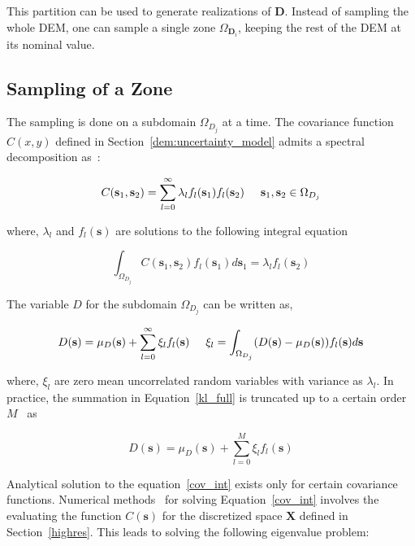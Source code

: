 This partition can be used to generate realizations of $\textbf{D}$. Instead of sampling the whole DEM, one can sample a single zone $\Omega_{\textbf{D}_i}$, keeping the rest of the DEM at its nominal value. 


\subsection{Sampling of a Zone}

The sampling is done on a subdomain $\Omega_{D_j}$ at a time. The covariance function $C(x,y)$ defined in Section~\ref{dem:uncertainty_model} admits a spectral decomposition as~\cite{ghanem2003stochastic}:

\begin{equation}
\label{cov_int}
C(\textbf{s}_1,\textbf{s}_2) = \sum_{l=0}^\infty \lambda_l f_l(\textbf{s}_1) f_l(\textbf{s}_2) \hspace{5mm} \textbf{s}_1,\textbf{s}_2 \in \Omega_{D_j}
\end{equation}

\noindent where, $\lambda_l$ and $f_l(\textbf{s})$ are solutions to the following integral equation

\begin{equation}
\int_{\Omega_{D_j}} C(\textbf{s}_1,\textbf{s}_2) f_l(\textbf{s}_1)d\textbf{s}_1 = \lambda_l f_l(\textbf{s}_2)
\end{equation}

The variable $D$ for the subdomain $\Omega_{D_j}$ can be written as,

\begin{equation}
\label{kl_full}
D(\textbf{s}) = \mu_D(\textbf{s}) + \sum_{l=0}^\infty \xi_l f_l(\textbf{s}) \hspace{5mm} \xi_l = \int_{\Omega_{D_j}} (D(\textbf{s}) - \mu_D(\textbf{s}) )f_l(\textbf{s})d\textbf{s}
\end{equation}

\noindent where, $\xi_l$ are zero mean uncorrelated random variables with variance as $\lambda_l$. In practice, the summation in Equation~\ref{kl_full} is truncated up to a certain order $M$~\cite{ghanem2003stochastic} as

\begin{equation}
\label{kl_trunc}
D(\textbf{s}) = \mu_D(\textbf{s}) + \sum_{l=0}^M \xi_l f_l(\textbf{s})
\end{equation}

 
Analytical solution to the equation~\ref{cov_int} exists only for certain covariance functions. Numerical methods~\cite{atkinson2009numerical,hansen1992numerical} for solving Equation~\ref{cov_int} involves the evaluating the function $C(\textbf{s})$ for the discretized space $\textbf{X}$ defined in Section~\ref{highres}. This leads to solving the following eigenvalue problem: 

